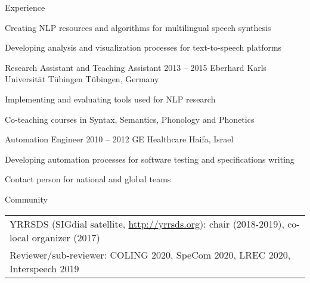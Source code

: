 \documentclass{resume} %
\begin{document}
\begin{rSection}{Experience}
\begin{rSubsection}
	\setlength{\itemindent}{.7cm}

	\item Creating NLP resources and algorithms for multilingual speech synthesis
	\item Developing analysis and visualization processes for text-to-speech platforms
\end{rSubsection}

\begin{rSubsection}
	{Research Assistant and Teaching Assistant}
	{2013 -- 2015}
	{Eberhard Karls Universität Tübingen}
	{Tübingen, Germany}
	
	\setlength{\itemindent}{.7cm}
	
	\item Implementing and evaluating tools used for NLP research %
	\item Co-teaching courses in Syntax, Semantics, Phonology and Phonetics %
\end{rSubsection}

\begin{rSubsection}
	{Automation Engineer}
	{2010 -- 2012}
	{GE Healthcare}
	{Haifa, Israel}
	
	\setlength{\itemindent}{.7cm}
	
	\item Developing automation processes for software testing and specifications writing
	\item Contact person for national and global teams 
\end{rSubsection}

\end{rSection}


\begin{rSection}{Community}
	\begin{tabular}{l}
		YRRSDS (SIGdial satellite, \url{http://yrrsds.org}): chair (2018-2019), co-local organizer (2017)\\
		Reviewer/sub-reviewer: COLING 2020, SpeCom 2020, LREC 2020, Interspeech 2019
	\end{tabular}
\end{rSection}
\end{document}
